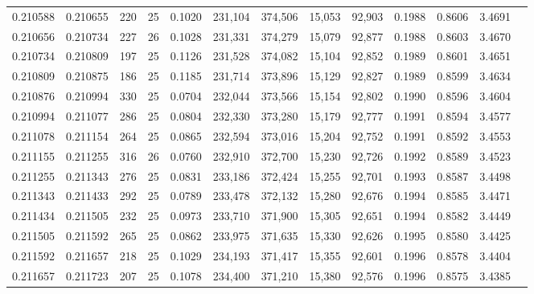 \begin{tabular}{rrrrrrrrrrrrr}
0.210588 & 0.210655 &   220 &  25 &                                     0.1020 & 231,104 & 374,506 &  15,053 &  92,903 & 0.1988 & 0.8606 & 3.4691 \\
0.210656 & 0.210734 &   227 &  26 &                                     0.1028 & 231,331 & 374,279 &  15,079 &  92,877 & 0.1988 & 0.8603 & 3.4670 \\
0.210734 & 0.210809 &   197 &  25 &                                     0.1126 & 231,528 & 374,082 &  15,104 &  92,852 & 0.1989 & 0.8601 & 3.4651 \\
0.210809 & 0.210875 &   186 &  25 &                                     0.1185 & 231,714 & 373,896 &  15,129 &  92,827 & 0.1989 & 0.8599 & 3.4634 \\
0.210876 & 0.210994 &   330 &  25 &                                     0.0704 & 232,044 & 373,566 &  15,154 &  92,802 & 0.1990 & 0.8596 & 3.4604 \\
0.210994 & 0.211077 &   286 &  25 &                                     0.0804 & 232,330 & 373,280 &  15,179 &  92,777 & 0.1991 & 0.8594 & 3.4577 \\
0.211078 & 0.211154 &   264 &  25 &                                     0.0865 & 232,594 & 373,016 &  15,204 &  92,752 & 0.1991 & 0.8592 & 3.4553 \\
0.211155 & 0.211255 &   316 &  26 &                                     0.0760 & 232,910 & 372,700 &  15,230 &  92,726 & 0.1992 & 0.8589 & 3.4523 \\
0.211255 & 0.211343 &   276 &  25 &                                     0.0831 & 233,186 & 372,424 &  15,255 &  92,701 & 0.1993 & 0.8587 & 3.4498 \\
0.211343 & 0.211433 &   292 &  25 &                                     0.0789 & 233,478 & 372,132 &  15,280 &  92,676 & 0.1994 & 0.8585 & 3.4471 \\
0.211434 & 0.211505 &   232 &  25 &                                     0.0973 & 233,710 & 371,900 &  15,305 &  92,651 & 0.1994 & 0.8582 & 3.4449 \\
0.211505 & 0.211592 &   265 &  25 &                                     0.0862 & 233,975 & 371,635 &  15,330 &  92,626 & 0.1995 & 0.8580 & 3.4425 \\
0.211592 & 0.211657 &   218 &  25 &                                     0.1029 & 234,193 & 371,417 &  15,355 &  92,601 & 0.1996 & 0.8578 & 3.4404 \\
0.211657 & 0.211723 &   207 &  25 &                                     0.1078 & 234,400 & 371,210 &  15,380 &  92,576 & 0.1996 & 0.8575 & 3.4385 \\

\end{tabular}
